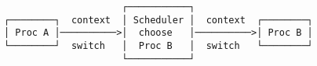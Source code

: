 \documentclass[varwidth,crop]{standalone}
\begin{document}
\begin{verbatim}
                     ┌───────────┐
┌────────┐  context  │ Scheduler │  context  ┌────────┐
│ Proc A │──────────>│  choose   │──────────>│ Proc B │
└────────┘  switch   │  Proc B   │  switch   └────────┘
                     └───────────┘
\end{verbatim}
\end{document}

